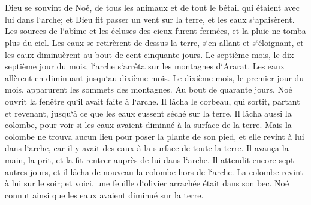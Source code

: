 \chapter{}

\verse Dieu se souvint de Noé, de tous les animaux et de tout le bétail qui étaient avec lui dans l`arche; et Dieu fit passer un vent sur la terre, et les eaux s`apaisèrent. 
\verse Les sources de l`abîme et les écluses des cieux furent fermées, et la pluie ne tomba plus du ciel. 
\verse Les eaux se retirèrent de dessus la terre, s`en allant et s`éloignant, et les eaux diminuèrent au bout de cent cinquante jours. 
\verse Le septième mois, le dix-septième jour du mois, l`arche s`arrêta sur les montagnes d`Ararat. 
\verse Les eaux allèrent en diminuant jusqu`au dixième mois. Le dixième mois, le premier jour du mois, apparurent les sommets des montagnes. 
\verse Au bout de quarante jours, Noé ouvrit la fenêtre qu`il avait faite à l`arche. 
\verse Il lâcha le corbeau, qui sortit, partant et revenant, jusqu`à ce que les eaux eussent séché sur la terre. 
\verse Il lâcha aussi la colombe, pour voir si les eaux avaient diminué à la surface de la terre. 
\verse Mais la colombe ne trouva aucun lieu pour poser la plante de son pied, et elle revint à lui dans l`arche, car il y avait des eaux à la surface de toute la terre. Il avança la main, la prit, et la fit rentrer auprès de lui dans l`arche. 
\verse Il attendit encore sept autres jours, et il lâcha de nouveau la colombe hors de l`arche. 
\verse La colombe revint à lui sur le soir; et voici, une feuille d`olivier arrachée était dans son bec. Noé connut ainsi que les eaux avaient diminué sur la terre. 
